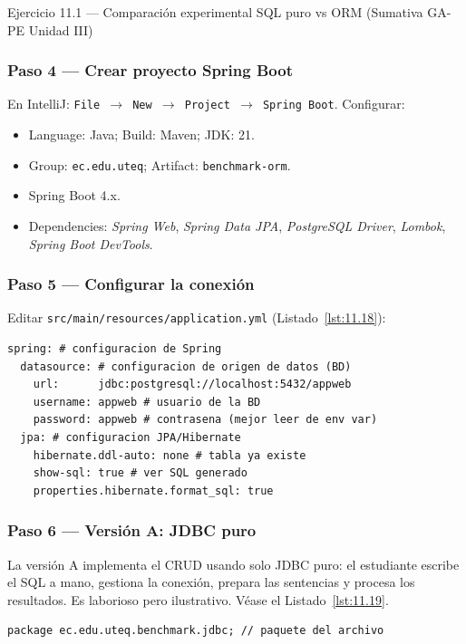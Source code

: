 \begin{cajaejercicio}{Ejercicio 11.1 --- Comparación experimental SQL puro vs ORM (Sumativa GA-PE Unidad III)}
\subsubsection*{Paso 4 --- Crear proyecto Spring Boot}

En IntelliJ: \texttt{File $\rightarrow$ New $\rightarrow$ Project
$\rightarrow$ Spring Boot}. Configurar:
\begin{itemize}
\item Language: Java; Build: Maven; JDK: 21.
\item Group: \texttt{ec.edu.uteq}; Artifact: \texttt{benchmark-orm}.
\item Spring Boot 4.x.
\item Dependencies: \emph{Spring Web}, \emph{Spring Data JPA},
\emph{PostgreSQL Driver}, \emph{Lombok}, \emph{Spring Boot DevTools}.
\end{itemize}

\subsubsection*{Paso 5 --- Configurar la conexión}

Editar \texttt{src/main/resources/application.yml} (Listado~\ref{lst:11.18}):

\begin{lstlisting}[style=yaml,numbers=none,caption={Ejemplo de YAML},label=lst:11.18]
spring: # configuracion de Spring
  datasource: # configuracion de origen de datos (BD)
    url:      jdbc:postgresql://localhost:5432/appweb
    username: appweb # usuario de la BD
    password: appweb # contrasena (mejor leer de env var)
  jpa: # configuracion JPA/Hibernate
    hibernate.ddl-auto: none # tabla ya existe
    show-sql: true # ver SQL generado
    properties.hibernate.format_sql: true
\end{lstlisting}

\subsubsection*{Paso 6 --- Versión A: JDBC puro}

La versión A implementa el CRUD usando solo JDBC puro: el
estudiante escribe el SQL a mano, gestiona la conexión, prepara las
sentencias y procesa los resultados. Es laborioso pero ilustrativo. V\'ease el Listado~\ref{lst:11.19}.


\begin{lstlisting}[style=java,caption={JdbcController.java},label=lst:11.19]
package ec.edu.uteq.benchmark.jdbc; // paquete del archivo


\end{lstlisting}
\end{cajaejercicio}
